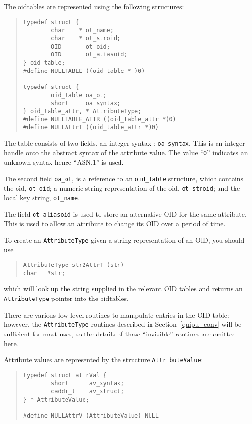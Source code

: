 The oidtables are represented using the following structures:
\begin{quote}\small\begin{verbatim}
typedef struct {
        char    * ot_name;
        char    * ot_stroid;
        OID       ot_oid;
        OID       ot_aliasoid;
} oid_table;
#define NULLTABLE ((oid_table * )0)

typedef struct {
        oid_table oa_ot;
        short     oa_syntax;
} oid_table_attr, * AttributeType;
#define NULLTABLE_ATTR ((oid_table_attr *)0)
#define NULLAttrT ((oid_table_attr *)0)
\end{verbatim}\end{quote}

The table consists of two fields, an integer syntax : \verb"oa_syntax".
This is an integer handle onto the abstract syntax of the attribute value.
The value ``\verb"0"'' indicates an unknown syntax hence ``ASN.1'' is used.

The second field \verb"oa_ot", is a reference to an \verb"oid_table" structure,
which contains the oid, \verb"ot_oid"; a numeric string representation 
of the oid, 
\verb"ot_stroid"; and the local key string, \verb"ot_name".

The field \verb+ot_aliasoid+ is used to store an alternative OID for
the same attribute.  This is used to allow an attribute to change its
OID over a period of time.

To create an \verb"AttributeType" given a string representation of an
OID, you should use
\begin{quote}\small\begin{verbatim}
AttributeType str2AttrT (str)
char   *str;
\end{verbatim}\end{quote}
which will look up the string supplied in the relevant OID tables and 
returns an
\verb"AttributeType" pointer into the oidtables.

There are various low level routines to manipulate entries in
the OID table; however, the \verb"AttributeType" routines described in 
Section~\ref{quipu_conv}
will be sufficient for most uses, so the details of these
``invisible'' routines are omitted here.


Attribute values are represented by the structure \verb"AttributeValue":

\begin{quote}\small\begin{verbatim}
typedef struct attrVal {
        short      av_syntax;
        caddr_t    av_struct;
} * AttributeValue;

#define NULLAttrV (AttributeValue) NULL
\end{verbatim}\end{quote}

